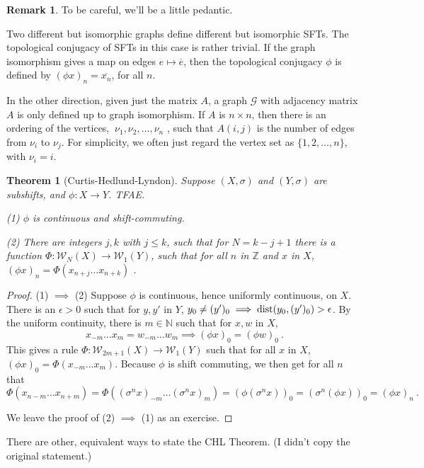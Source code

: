 \documentclass{amsart}
\newcommand{\si}{\index}
\newtheorem{thm}[equation]{Theorem}
\theoremstyle{definition}
\newtheorem{rem}[equation]{Remark}
\theoremstyle{definition}
\newcommand{\dist}{\textnormal{dist}}
\newcommand{\Z}{\mathbb Z}
\newcommand{\N}{\mathbb N}
\numberwithin{equation}{subsection}
\begin{document}
\begin{rem} \label{edgesftnote}
To be careful, we'll be a little pedantic.

Two different but isomorphic graphs define different but isomorphic
SFTs. The topological conjugacy of SFTs in this case  is
rather trivial. If the graph isomorphism gives a map on edges
$e\mapsto \overline e$, then the topological conjugacy $\phi$
is defined by $(\phi x)_n = \overline{x_n}$, for all $n$.

In the other direction, given
just the matrix $A$, a graph $\mathcal G$ with adjacency matrix $A$ is only defined
up to graph isomorphism.  If $A$ is $n\times n$,
then there is an ordering of the  vertices, $\ \nu_1, \nu_2, \dots ,\nu_n$ ,
such that $A(i,j)$ is the number of edges from $\nu_i$ to $ \nu_j$.
For simplicity, we often just regard the vertex set as
$\{ 1,2, \dots , n \}$, with $\nu_i =i$.
\end{rem}


\begin{thm} [Curtis-Hedlund-Lyndon\si{Curtis-Hedlund-Lyndon Theorem}] \label{chl}
     Suppose $(X,\sigma)$ and $(Y,\sigma)$ are subshifts, and
$\phi : X \to Y$. TFAE.

     (1) $\phi $ is continuous and shift-commuting.

     (2) There are integers $j,k$ with $j\leq k$,
such that for $N=k-j+1$  there is
 a function
     $\Phi : \mathcal W_N(X) \to \mathcal W_1(Y)$,  such that
    for all $n$ in $\Z$ and $x$ in $X$,
     $(\phi x)_n = \Phi (x_{n +j} \dots x_{n+k})$ .
\end{thm}
\begin{proof}
(1) $\implies $ (2) Suppose $\phi$ is continuous, hence
uniformly continuous, on $X$. There is an $\epsilon >0$ such that
for $y, y'$ in $Y$, $y_0 \neq (y')_0 \implies \dist (y_0, (y')_0) > \epsilon $.
By the uniform continuity, there is $m\in \N $ such that for $x,w$ in $X$,
\[
x_{-m}\dots x_m = w_{-m}\dots w_m
   \implies
(\phi x)_0 = (\phi w)_0\ .
\]
 This gives a rule
$\Phi : \mathcal W_{2m+1} (X) \to \mathcal W_1 (Y) $
such that for all $x$ in  $X$,
$(\phi x)_0 = \Phi (x_{-m} \dots x_m)$. Because $\phi$ is shift commuting,
we then get for all $n$ that
\[
\Phi (x_{n-m} \dots x_{n+m})
= \Phi ((\sigma^n x)_{-m} \dots (\sigma^n x)_m)
= (\phi (\sigma^n x) )_0
 = ( \sigma^n(\phi x) )_0
= (\phi x)_n \ .
\]

We leave the proof of (2) $\implies $ (1) as an exercise.
\end{proof}
There are other, equivalent  ways to state the CHL Theorem.
(I didn't copy the original statement.)
\end{document}
